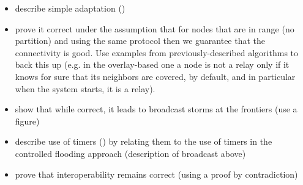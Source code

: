 \begin{itemize}
	\item describe simple adaptation ()
	\item prove it correct under the assumption that for nodes that are in range (no partition) and using the same protocol then we guarantee that the connectivity is good. Use examples from previously-described algorithms to back this up (e.g. in the overlay-based one a node is not a relay only if it knows for sure that its neighbors are covered, by default, and in particular when the system starts, it is a relay). 
	\item show that while correct, it leads to broadcast storms at the frontiers (use a figure)
\end{itemize}

\begin{itemize}
	\item describe use of timers () by relating them to the use of timers in the controlled flooding approach (description of broadcast above)
	\item prove that interoperability remains correct (using a proof by contradiction)
\end{itemize}
